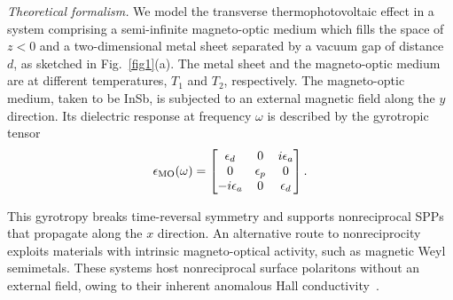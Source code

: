 \documentclass[aps,prl,twocolumn,longbibliography]{revtex4-2}
\begin{document}
{\it Theoretical formalism.}
We model the transverse thermophotovoltaic effect in a system comprising a semi-infinite
magneto-optic medium which fills the space of $z<0$ and a two-dimensional metal sheet
separated by a vacuum gap of distance $d$, as sketched in Fig.~\ref{fig1}(a).
The metal sheet and the magneto-optic medium are at different temperatures, $T_1$ and
$T_2$, respectively.
The magneto-optic medium, taken to be InSb, is subjected to an external magnetic field
along the $y$ direction. Its dielectric response at frequency $\omega$ is described by the
gyrotropic tensor~\cite{InSb_76}
\begin{equation} \label{epsilon_MO}
  \epsilon_{\rm MO}(\omega) =
  \begin{bmatrix}
    \epsilon_d & 0 & i\epsilon_a \\
    0 & \epsilon_p & 0 \\
    -i\epsilon_a & 0 & \epsilon_d
  \end{bmatrix} .
\end{equation}


This gyrotropy breaks time-reversal symmetry and supports nonreciprocal SPPs that
propagate along the $x$ direction.
An alternative route to nonreciprocity exploits materials with intrinsic magneto-optical
activity, such as magnetic Weyl semimetals. These systems host nonreciprocal surface
polaritons without an external field, owing to their inherent anomalous Hall
conductivity~\cite{WSM_SPP16, Kotov18, WSM_AHE_20nc, GT_WSM}.
\end{document}
